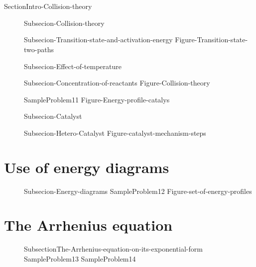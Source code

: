 \documentclass[main.tex]{subfiles}
\begin{document}
\section{\color{blue!30!black}{Collision theory}}{SectionIntro-Collision-theory}
\sloppy \begin{description}
\item[] {Subsecion-Collision-theory}
\item[]{Subsecion-Transition-state-and-activation-energy} 
{Figure-Transition-state-two-paths} 
\item[] {Subsecion-Effect-of-temperature} 
\item[] {Subsecion-Concentration-of-reactants}
 \vspace{3cm}  {Figure-Collision-theory} \newpage

{SampleProblem11}
{Figure-Energy-profile-catalys}  

\item[] {Subsecion-Catalyst}
\item[] {Subsecion-Hetero-Catalyst}
{Figure-catalyst-mechanism-steps}  
\end{description}

 

\section{Use of energy diagrams}
\sloppy \begin{description}
\item[] {Subsecion-Energy-diagrams}
  {SampleProblem12}
  {Figure-set-of-energy-profiles}
\end{description}


\section{The Arrhenius equation}
\sloppy \begin{description}
\item[] {SubsectionThe-Arrhenius-equation-on-its-exponential-form}
  {SampleProblem13}
  {SampleProblem14}
\end{description}
\end{document}
